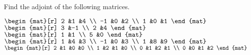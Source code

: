 
\begin{Exercise}[
name={},
title={}, 
difficulty=0,
origin={\cite{JH}}]
Find the adjoint of the following matrices.
\begin{multicols}{2}
\Question \( \begin{mat}[r]
                 2   &1  &4  \\
                -1   &0  &2  \\
                 1   &0  &1
               \end{mat}  \)
\Question \( \begin{mat}[r]
                 3  &-1  \\
                 2  &4
               \end{mat}  \)
\Question \( \begin{mat}[r]
                 1   &1  \\
                 5   &0
               \end{mat}  \)
\Question \( \begin{mat}[r]
                 1   &4  &3  \\
                -1   &0  &3  \\
                 1   &8  &9
               \end{mat}  \)
\Question $\begin{mat}[r]
        2  &1  &0  &0  \\
        1  &2  &1  &0  \\
        0  &1  &2  &1  \\
        0  &0  &1  &2
      \end{mat}$
\EndCurrentQuestion
\end{multicols}
\end{Exercise}

